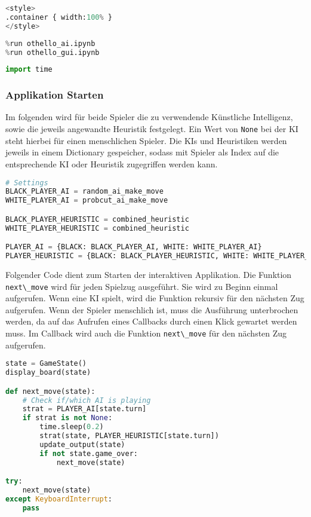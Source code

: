 \begin{lstlisting}[language=Python]
%%HTML
<style>
.container { width:100% }
</style>
\end{lstlisting}

\begin{lstlisting}[language=Python]
%run othello_game.ipynb
%run othello_ai.ipynb
%run othello_gui.ipynb
\end{lstlisting}

\begin{lstlisting}[language=Python]
import time
\end{lstlisting}

\hypertarget{applikation-starten}{%
\subsubsection{Applikation Starten}\label{applikation-starten}}

Im folgenden wird für beide Spieler die zu verwendende Künstliche
Intelligenz, sowie die jeweils angewandte Heuristik festgelegt. Ein Wert
von \passthrough{\lstinline!None!} bei der KI steht hierbei für einen
menschlichen Spieler. Die KIs und Heuristiken werden jeweils in einem
Dictionary gespeicher, sodass mit Spieler als Index auf die
entsprechende KI oder Heuristik zugegriffen werden kann.

\begin{lstlisting}[language=Python]
# Settings
BLACK_PLAYER_AI = random_ai_make_move
WHITE_PLAYER_AI = probcut_ai_make_move

BLACK_PLAYER_HEURISTIC = combined_heuristic
WHITE_PLAYER_HEURISTIC = combined_heuristic

PLAYER_AI = {BLACK: BLACK_PLAYER_AI, WHITE: WHITE_PLAYER_AI}
PLAYER_HEURISTIC = {BLACK: BLACK_PLAYER_HEURISTIC, WHITE: WHITE_PLAYER_HEURISTIC}
\end{lstlisting}

Folgender Code dient zum Starten der interaktiven Applikation. Die
Funktion \passthrough{\lstinline!next\_move!} wird für jeden Spielzug
ausgeführt. Sie wird zu Beginn einmal aufgerufen. Wenn eine KI spielt,
wird die Funktion rekursiv für den nächsten Zug aufgerufen. Wenn der
Spieler menschlich ist, muss die Ausführung unterbrochen werden, da auf
das Aufrufen eines Callbacks durch einen Klick gewartet werden muss. Im
Callback wird auch die Funktion \passthrough{\lstinline!next\_move!} für
den nächsten Zug aufgerufen.

\begin{lstlisting}[language=Python]
state = GameState()
display_board(state)

def next_move(state):
    # Check if/which AI is playing
    strat = PLAYER_AI[state.turn]
    if strat is not None:
        time.sleep(0.2)
        strat(state, PLAYER_HEURISTIC[state.turn])
        update_output(state)
        if not state.game_over:
            next_move(state)

try:
    next_move(state)
except KeyboardInterrupt:
    pass
\end{lstlisting}
